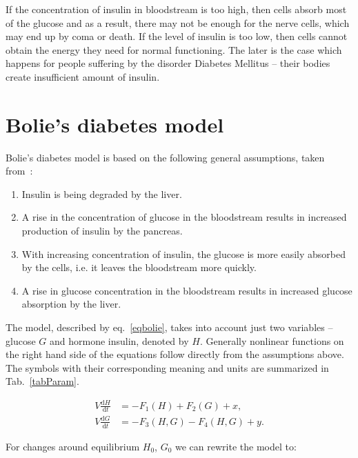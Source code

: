 \documentclass{article}
\providecommand{\m}[1]{\ensuremath{\mathrm{#1}}}
\begin{document}
If the concentration of insulin in bloodstream is too high, then cells absorb most of the glucose 
and as a result, there may not be enough for the nerve cells, which may end up by coma or death.
If the level of insulin is too low, then cells cannot obtain the energy they need for normal functioning.
The later is the case which happens for people suffering by the disorder Diabetes Mellitus -- their bodies
create insufficient amount of insulin.


\section{Bolie's diabetes model}

Bolie's diabetes model is based on the following general assumptions, taken from~\cite{fulford_modelling_1997}:

\begin{enumerate}
	\item
	Insulin is being degraded by the liver.	
	\item
	A rise in the concentration of glucose in the bloodstream results in increased production of insulin by the pancreas.
	\item
	With increasing concentration of insulin, the glucose is more easily absorbed by the cells, i.e. it leaves the bloodstream more quickly.
	\item
	A rise in glucose concentration in the bloodstream results in increased glucose absorption by the liver.

\end{enumerate}


The model, described by eq.~\ref{eqbolie}, takes into account just two variables -- glucose $G$ and hormone insulin, denoted by $H$. Generally nonlinear functions on the right hand side of the equations follow directly from the assumptions above. The symbols with their corresponding meaning and units are summarized in Tab.~\ref{tabParam}. 

\begin{equation}
\label{eqbolie}
\begin{aligned}
V\frac{\m{d} H}{\m{d} t}&=-F_1(H)+F_2(G)+ x,\\
V\frac{\m{d} G}{\m{d} t}&=-F_3(H,G)-F_4(H,G) + y. 
\end{aligned}
\end{equation}

For changes around equilibrium $H_0$, $G_0$ we can rewrite the model to:
\end{document}
